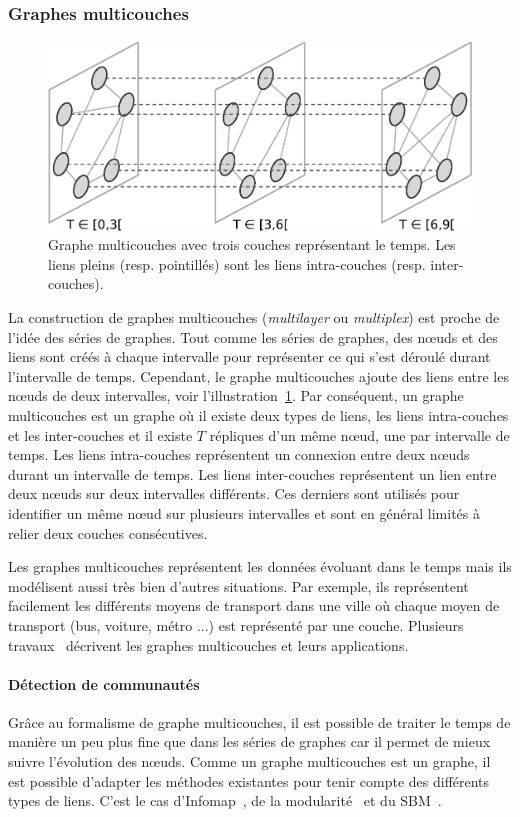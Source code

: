 \subsubsection{Graphes multicouches}
\begin{figure}[h]
\centering
\includegraphics[width=0.7\linewidth]{img/Intro/multiplex.eps}
\caption{Graphe multicouches avec trois couches représentant le temps.
Les liens pleins (resp. pointillés) sont les liens intra-couches (resp. inter-couches).}
\label{fig:exemple_multiplex}
\end{figure}
La construction de graphes multicouches (\emph{multilayer} ou \emph{multiplex}) est proche de l'idée des séries de graphes.
Tout comme les séries de graphes, des n\oe{}uds et des liens sont créés à chaque intervalle pour représenter ce qui s'est déroulé durant l'intervalle de temps.
Cependant, le graphe multicouches ajoute des liens entre les n\oe{}uds de deux intervalles, voir l'illustration~\ref{fig:exemple_multiplex}.
Par conséquent, un graphe multicouches est un graphe où il existe deux types de liens, les liens intra-couches et les inter-couches et il existe $T$ répliques d'un même n\oe{}ud, une par intervalle de temps.
Les liens intra-couches représentent un connexion entre deux n\oe{}uds durant un intervalle de temps.
Les liens inter-couches représentent un lien entre deux n\oe{}uds sur deux intervalles différents.
Ces derniers sont utilisés pour identifier un même n\oe{}ud sur plusieurs intervalles et sont en général limités à relier deux couches consécutives.

Les graphes multicouches représentent les données évoluant dans le temps mais ils modélisent aussi très bien d'autres situations.
Par exemple, ils représentent facilement les différents moyens de transport dans une ville où chaque moyen de transport (bus, voiture, métro ...) est représenté par une couche.
Plusieurs travaux~\cite{DeDomenico2013,Kivela2014,Boccaletti2014,wehmuth2015multiaspect} décrivent les graphes multicouches et leurs applications.



\paragraph{Détection de communautés}
Grâce au formalisme de graphe multicouches, il est possible de traiter le temps de manière un peu plus fine que dans les séries de graphes car il permet de mieux suivre l'évolution des n\oe{}uds.
Comme un graphe multicouches est un graphe, il est possible d'adapter les méthodes existantes pour tenir compte des différents types de liens.
C'est le cas d'Infomap~\cite{de2015identifying}, de la modularité~\cite{Mucha2010,Bassett2013,Bazzi2016} et du SBM~\cite{Stanley,Peixoto2015c}.


